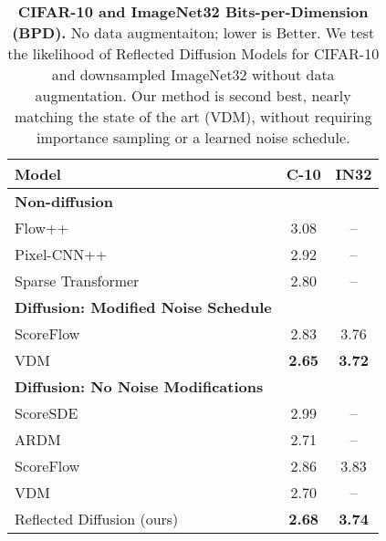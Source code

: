 \documentclass{article}
\theoremstyle{plain}
\theoremstyle{definition}
\theoremstyle{remark}
\begin{document}
\begin{table}[!h]
    \centering
    \begin{tabular}{l c c}
        Model & C-10 & IN32\\
        \hline
        \textbf{Non-diffusion} & &\\
        \hline
        Flow++ \citep{Ho2019FlowIF} & 3.08 & --\\
        Pixel-CNN++ \citep{Salimans2017PixelCNNIT} & 2.92 &--\\
        Sparse Transformer \citep{Child2019GeneratingLS} & 2.80 & --\\
        \hline
        \textbf{Diffusion: Modified Noise Schedule} & &\\
        \hline
        ScoreFlow \citep{Song2021MaximumLT}& 2.83 & 3.76\\
        VDM \citep{Kingma2021VariationalDM} & \textbf{2.65} & \textbf{3.72}\\
        \hline
        \textbf{Diffusion: No Noise Modifications} & &\\
        \hline
        ScoreSDE \citep{Song2020ScoreBasedGM} & 2.99 & --\\
        ARDM \citep{Hoogeboom2021AutoregressiveDM} & 2.71 & --\\
        ScoreFlow \citep{Song2021MaximumLT}& 2.86 & 3.83\\
        VDM \citep{Kingma2021VariationalDM} & 2.70 & --\\
        \hline
        Reflected Diffusion (ours) & \textbf{2.68} & \textbf{3.74}\\
    \end{tabular}
    \caption{\textbf{CIFAR-10 and ImageNet32 Bits-per-Dimension (BPD).} No data augmentaiton; lower is Better. We test the likelihood of Reflected Diffusion Models for CIFAR-10 and downsampled ImageNet32 without data augmentation. Our method is second best, nearly matching the state of the art (VDM), without requiring importance sampling or a learned noise schedule.}
    \label{tab:likelihoods}
    \vspace{-4mm}
\end{table}
\end{document}

